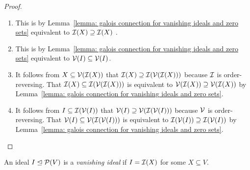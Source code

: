 \begin{proof}
  \leavevmode
  \begin{enumerate}
    \item
      This is by Lemma~\ref{lemma: galois connection for vanishing ideals and zero sets} equivalent to $\mathcal{I}(X) \supseteq \mathcal{I}(X)$ .
    \item
      This is by Lemma~\ref{lemma: galois connection for vanishing ideals and zero sets} equivalent to $\mathcal{V}(I) \subseteq \mathcal{V}(I)$.
    \item
      It follows from $X \subseteq \mathcal{V}(\mathcal{I}(X))$ that $\mathcal{I}(X) \supseteq \mathcal{I}(\mathcal{V}(\mathcal{I}(X)))$ because $\mathcal{I}$ is order-reversing.
      That $\mathcal{I}(X) \subseteq \mathcal{I}(\mathcal{V}(\mathcal{I}(X)))$ is equivalent to $\mathcal{V}(\mathcal{I}(X)) \supseteq \mathcal{V}(\mathcal{I}(X)) $ by Lemma~\ref{lemma: galois connection for vanishing ideals and zero sets}.
    \item
      It follows from $I \subseteq \mathcal{I}(\mathcal{V}(I))$ that $\mathcal{V}(I) \supseteq \mathcal{V}(\mathcal{I}(\mathcal{V}(I)))$ because $\mathcal{V}$ is order-reversing.
      That $\mathcal{V}(I) \subseteq \mathcal{V}(\mathcal{I}(\mathcal{V}(I)))$ is equivalent to $\mathcal{I}(\mathcal{V}(I)) \supseteq \mathcal{I}(\mathcal{V}(I)) $ by Lemma~\ref{lemma: galois connection for vanishing ideals and zero sets}.
    \qedhere
  \end{enumerate}
\end{proof}


\begin{definition}
  An ideal $I \trianglelefteq \mathcal{P}(V)$ is a \emph{vanishing ideal} if $I = \mathcal{I}(X)$ for some $X \subseteq V$.
\end{definition}


